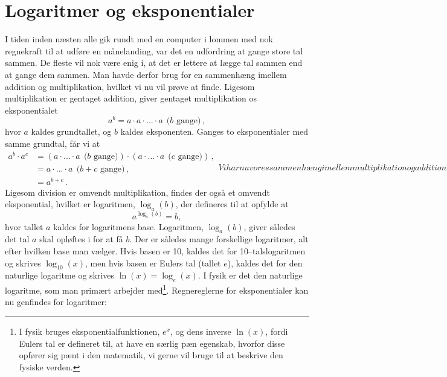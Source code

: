 \section{Logaritmer og eksponentialer} \label{mat:sec:log}
I tiden inden næsten alle gik rundt med en computer i lommen med nok regnekraft til at udføre en månelanding, var det en udfordring at gange store tal sammen.
De fleste vil nok være enig i, at det er lettere at lægge tal sammen end at gange dem sammen. Man havde derfor brug for en sammenhæng imellem addition og multiplikation, hvilket vi nu vil prøve at finde.
Ligesom multiplikation er gentaget addition, giver gentaget multiplikation os eksponentialet
$$
a^b=a\cdot a\cdot ...\cdot a~~\text{($b$ gange)} \, ,
$$
hvor $a$ kaldes grundtallet, og $b$ kaldes eksponenten. Ganges to eksponentialer med samme grundtal, får vi at
\begin{subequations} \label{mat:eq:exp_regel}
\begin{align}
   a^b\cdot a^c&=(a\cdot ...\cdot a~~\text{($b$ gange)})\cdot(a\cdot ...\cdot a~~\text{($c$ gange)})\nonumber \, ,\\
   &=a\cdot ...\cdot a~~\text{($b+c$ gange)}\nonumber \, ,\\
   &=a^{b+c} \, \label{mat:eq:exp_regel1}.
\end{align}
Vi har nu vores sammenhæng imellem multiplikation og addition, men inden vi fortsætter, bemærker vi to eksponentialregneregler:
\begin{align}
    \frac{a^b}{a^c}&=a^{b-c} \, \label{mat:eq:exp_regel2},\\
    \left(a^b\right)^c&=a^{bc} \, \label{mat:eq:exp_regel3}.
\end{align}
\end{subequations}
Ligesom division er omvendt multiplikation, findes der også et omvendt eksponential, hvilket er logaritmen, $\log_a(b)$, der defineres til at opfylde at
%
\begin{equation} \label{mat:eq:log_def}
     a^{\log_a(b)} = b,
\end{equation}
%
hvor tallet $a$ kaldes for logaritmens base. Logaritmen, $\log_a(b)$, giver således det tal $a$ skal opløftes i for at få $b$. Der er således mange forskellige logaritmer, alt efter hvilken base man vælger. Hvis basen er 10, kaldes det for 10--talslogaritmen og skrives $\log_{10}(x)$, men hvis basen er Eulers tal (tallet $e$), kaldes det for den naturlige logaritme og skrives $\ln(x) = \log_e(x)$. I fysik er det den naturlige logaritme, som man primært arbejder med\footnote{I fysik bruges eksponentialfunktionen, $e^x$, og dens inverse $\ln(x)$, fordi Eulers tal er defineret til, at have en særlig pæn egenskab, hvorfor disse opfører sig pænt i den matematik, vi gerne vil bruge til at beskrive den fysiske verden.}. Regnereglerne for eksponentialer kan nu genfindes for logaritmer:
